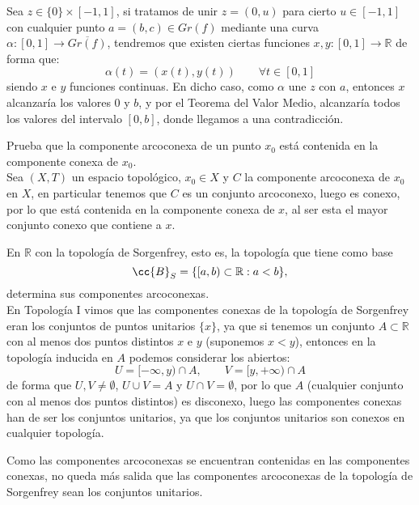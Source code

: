 \begin{ejercicio}
   Sea $z\in \{0\}\times [-1,1]$, si tratamos de unir $z=(0,u)$ para cierto $u\in [-1,1]$ con cualquier punto $a=(b,c)\in Gr(f)$ mediante una curva $\alpha:[0,1]\to \overline{Gr(f)}$, tendremos que existen ciertas funciones $x,y:[0,1]\to \mathbb{R}$ de forma que:
   \begin{equation*}
       \alpha(t) = (x(t), y(t)) \qquad \forall t\in [0,1]
   \end{equation*}
   siendo $x$ e $y$ funciones continuas. En dicho caso, como $\alpha$ une $z$ con $a$, entonces $x$ alcanzaría los valores $0$ y $b$, y por el Teorema del Valor Medio, alcanzaría todos los valores del intervalo $[0,b]$, donde llegamos a una contradicción.
\end{ejercicio}

\begin{ejercicio}
    Prueba que la componente arcoconexa de un punto $x_0$ está contenida en la componente conexa de $x_0$.\\

    \noindent
    Sea $(X,T)$ un espacio topológico, $x_0\in X$ y $C$ la componente arcoconexa de $x_0$ en $X$, en particular tenemos que $C$ es un conjunto arcoconexo, luego es conexo, por lo que está contenida en la componente conexa de $x$, al ser esta el mayor conjunto conexo que contiene a $x$.
\end{ejercicio}

\begin{ejercicio}
    En $\mathbb{R}$ con la topología de Sorgenfrey, esto es, la topología que tiene como base
    \begin{equation*}
        \cc{B}_S = \{[a,b) \subset \mathbb{R} : a<b\},
    \end{equation*}
    determina sus componentes arcoconexas.\\

    \noindent
    En Topología I vimos que las componentes conexas de la topología de Sorgenfrey eran los conjuntos de puntos unitarios $\{x\}$, ya que si tenemos un conjunto $A\subset \mathbb{R}$ con al menos dos puntos distintos $x$ e $y$ (suponemos $x<y$), entonces en la topología inducida en $A$ podemos considerar los abiertos:
    \begin{equation*}
        U = [-\infty,y)\cap A, \qquad V = [y,+\infty)\cap A
    \end{equation*}
    de forma que $U,V\neq \emptyset $, $U\cup V = A$ y $U\cap V = \emptyset $, por lo que $A$ (cualquier conjunto con al menos dos puntos distintos) es disconexo, luego las componentes conexas han de ser los conjuntos unitarios, ya que los conjuntos unitarios son conexos en cualquier topología.

    Como las componentes arcoconexas se encuentran contenidas en las componentes conexas, no queda más salida que las componentes arcoconexas de la topología de Sorgenfrey sean los conjuntos unitarios.
\end{ejercicio}

